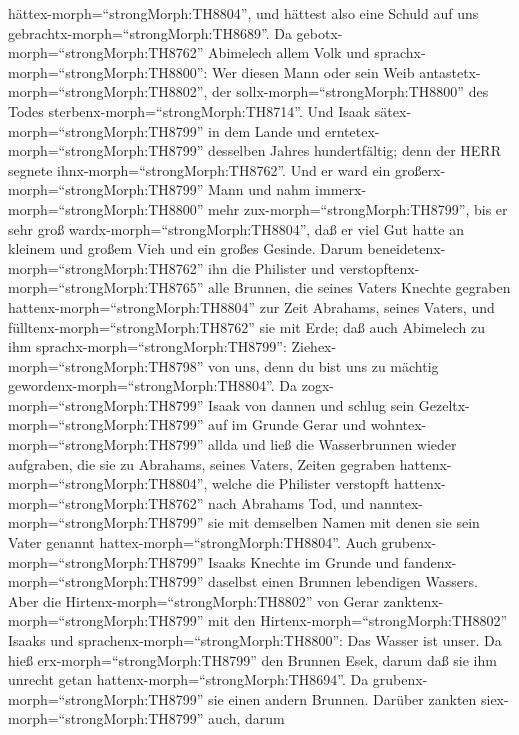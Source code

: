 hättex-morph=``strongMorph:TH8804'', und hättest also eine Schuld auf
uns gebrachtx-morph=``strongMorph:TH8689''.  Da
gebotx-morph=``strongMorph:TH8762'' Abimelech allem Volk und
sprachx-morph=``strongMorph:TH8800'': Wer diesen Mann oder sein Weib
antastetx-morph=``strongMorph:TH8802'', der
sollx-morph=``strongMorph:TH8800'' des Todes
sterbenx-morph=``strongMorph:TH8714''.  Und Isaak
sätex-morph=``strongMorph:TH8799'' in dem Lande und
erntetex-morph=``strongMorph:TH8799'' desselben Jahres hundertfältig;
denn der HERR segnete ihnx-morph=``strongMorph:TH8762''. 
Und er ward ein großerx-morph=``strongMorph:TH8799'' Mann und nahm
immerx-morph=``strongMorph:TH8800'' mehr
zux-morph=``strongMorph:TH8799'', bis er sehr groß
wardx-morph=``strongMorph:TH8804'',  daß er viel Gut hatte
an kleinem und großem Vieh und ein großes Gesinde. Darum
beneidetenx-morph=``strongMorph:TH8762'' ihn die Philister 
und verstopftenx-morph=``strongMorph:TH8765'' alle Brunnen, die seines
Vaters Knechte gegraben hattenx-morph=``strongMorph:TH8804'' zur Zeit
Abrahams, seines Vaters, und fülltenx-morph=``strongMorph:TH8762'' sie
mit Erde;  daß auch Abimelech zu ihm
sprachx-morph=``strongMorph:TH8799'':
Ziehex-morph=``strongMorph:TH8798'' von uns, denn du bist uns zu mächtig
gewordenx-morph=``strongMorph:TH8804''.  Da
zogx-morph=``strongMorph:TH8799'' Isaak von dannen und schlug sein
Gezeltx-morph=``strongMorph:TH8799'' auf im Grunde Gerar und
wohntex-morph=``strongMorph:TH8799'' allda  und ließ die
Wasserbrunnen wieder aufgraben, die sie zu Abrahams, seines Vaters,
Zeiten gegraben hattenx-morph=``strongMorph:TH8804'', welche die
Philister verstopft hattenx-morph=``strongMorph:TH8762'' nach Abrahams
Tod, und nanntex-morph=``strongMorph:TH8799'' sie mit demselben Namen
mit denen sie sein Vater genannt hattex-morph=``strongMorph:TH8804''.
 Auch grubenx-morph=``strongMorph:TH8799'' Isaaks Knechte
im Grunde und fandenx-morph=``strongMorph:TH8799'' daselbst einen
Brunnen lebendigen Wassers.  Aber die
Hirtenx-morph=``strongMorph:TH8802'' von Gerar
zanktenx-morph=``strongMorph:TH8799'' mit den
Hirtenx-morph=``strongMorph:TH8802'' Isaaks und
sprachenx-morph=``strongMorph:TH8800'': Das Wasser ist unser. Da hieß
erx-morph=``strongMorph:TH8799'' den Brunnen Esek, darum daß sie ihm
unrecht getan hattenx-morph=``strongMorph:TH8694''.  Da
grubenx-morph=``strongMorph:TH8799'' sie einen andern Brunnen. Darüber
zankten siex-morph=``strongMorph:TH8799'' auch, darum
